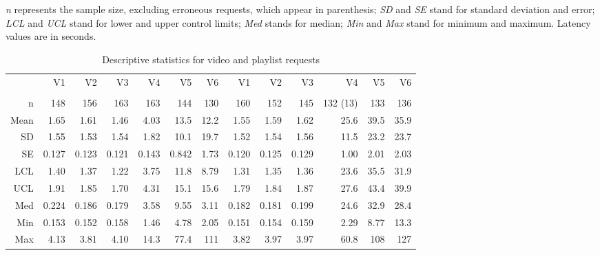 \begin{table}[p]
	\centering
	\caption{Descriptive statistics for video and playlist requests}
	{\emph{n} represents the sample size, excluding erroneous requests, which appear in parenthesis; \emph{SD} and \emph{SE} stand for standard deviation and error; \emph{LCL} and \emph{UCL} stand for lower and upper control limits; \emph{Med} stands for median; \emph{Min} and \emph{Max} stand for minimum and maximum. Latency values are in seconds.\\ [0.3cm]}
	\label{tab:evaluation--im-mean-latencies}
	\begin{adjustbox}{center}
		\begin{tabular}{
				>{\scriptsize}r
				>{\scriptsize}r >{\scriptsize}r >{\scriptsize}r >{\scriptsize}r >{\scriptsize}r >{\scriptsize}r
				| >{\scriptsize}r >{\scriptsize}r >{\scriptsize}r >{\scriptsize}r >{\scriptsize}r >{\scriptsize}r
			}
			\toprule
			& \multicolumn{6}{c}{\normalsize\textbf{Video Requests}} &
			\multicolumn{6}{c}{\normalsize\textbf{Playlist Requests}} \\
			\midrule
			& V1 & V2 & V3 & V4 & V5 & V6 &
			V1 & V2 & V3 & V4 & V5 & V6 \\
			\hline
			\multicolumn{13}{c}{\scriptsize Regular} \\
			\hline
			
			n & 148 & 156 & 163 & 163 & 144 & 130 &
			160 & 152 & 145 & 132 (13) & 133 & 136 \\
			Mean & 1.65 & 1.61 & 1.46 & 4.03 & 13.5 & 12.2 &
			1.55 & 1.59 & 1.62 & 25.6 & 39.5 & 35.9 \\
			SD & 1.55 & 1.53 & 1.54 & 1.82 & 10.1 & 19.7 &
			1.52 & 1.54 & 1.56 & 11.5 & 23.2 & 23.7 \\
			SE & 0.127 & 0.123 & 0.121 & 0.143 & 0.842 & 1.73 &
			0.120 & 0.125 & 0.129 & 1.00 & 2.01 & 2.03 \\
			LCL & 1.40 & 1.37 & 1.22 & 3.75 & 11.8 & 8.79 &
			1.31 & 1.35 & 1.36 & 23.6 & 35.5 & 31.9 \\
			UCL & 1.91 & 1.85 & 1.70 & 4.31 & 15.1 & 15.6 &
			1.79 & 1.84 & 1.87 & 27.6 & 43.4 & 39.9 \\
			Med & 0.224 & 0.186 & 0.179 & 3.58 & 9.55 & 3.11 &
			0.182 & 0.181 & 0.199 & 24.6 & 32.9 & 28.4 \\
			Min & 0.153 & 0.152 & 0.158 & 1.46 & 4.78 & 2.05 &
			0.151 & 0.154 & 0.159 & 2.29 & 8.77 & 13.3 \\
			Max & 4.13 & 3.81 & 4.10 & 14.3 & 77.4 & 111 &
			3.82 & 3.97 & 3.97 & 60.8 & 108 & 127 \\
			

\end{tabular}
\end{adjustbox}
\end{table}

